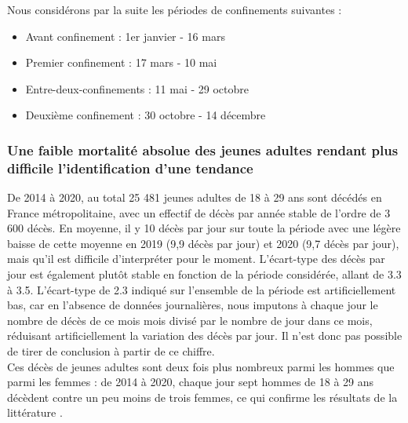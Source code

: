 \documentclass[titlepage]{article}
\begin{document}
Nous considérons par la suite les périodes de confinements suivantes : 
\begin{itemize}[nosep]
\item Avant confinement : 1er janvier - 16 mars
\item Premier confinement : 17 mars - 10 mai
\item Entre-deux-confinements : 11 mai - 29 octobre
\item Deuxième confinement : 30 octobre - 14 décembre
\end{itemize}


\subsubsection*{Une faible mortalité absolue des jeunes adultes rendant plus difficile l'identification d'une tendance}

De 2014 à 2020, au total 25 481 jeunes adultes de 18 à 29 ans sont décédés en France métropolitaine, avec un effectif de décès par année stable de l'ordre de 3 600 décès. En moyenne, il y 10 décès par jour sur toute la période avec une légère baisse de cette moyenne en 2019 (9,9 décès par jour) et 2020 (9,7 décès par jour), mais qu'il est difficile d'interpréter pour le moment. L'écart-type des décès par jour est également plutôt stable en fonction de la période considérée, allant de 3.3 à 3.5. L'écart-type de 2.3 indiqué sur l'ensemble de la période est artificiellement bas, car en l'absence de données journalières, nous imputons à chaque jour le nombre de décès de ce mois mois divisé par le nombre de jour dans ce mois, réduisant artificiellement la variation des décès par jour. Il n'est donc pas possible de tirer de conclusion à partir de ce chiffre. \\

Ces décès de jeunes adultes sont deux fois plus nombreux parmi les hommes que parmi les femmes : de 2014 à 2020, chaque jour sept hommes de 18 à 29 ans décèdent contre un peu moins de trois femmes, ce qui confirme les résultats de la littérature \parencite{breton_levolution_2019, remund_surmortalite_2021}. \\
\end{document}
